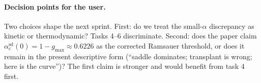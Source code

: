\documentclass[11pt]{article}
\newcommand{\acSd}{\alpha_c^{\mathrm{sd}}}
\begin{document}
\paragraph{Decision points for the user.}
Two choices shape the next sprint.  First: do we treat the
small-$\alpha$ discrepancy as kinetic or thermodynamic?  Tasks 4--6
discriminate.  Second: does the paper claim
$\acSd(0) = 1 - g_{\max} \approx 0.6226$ as the corrected Ramsauer
threshold, or does it remain in the present descriptive form
(``saddle dominates; transplant is wrong; here is the curve'')?
The first claim is stronger and would benefit from task 4 first.



\end{document}
